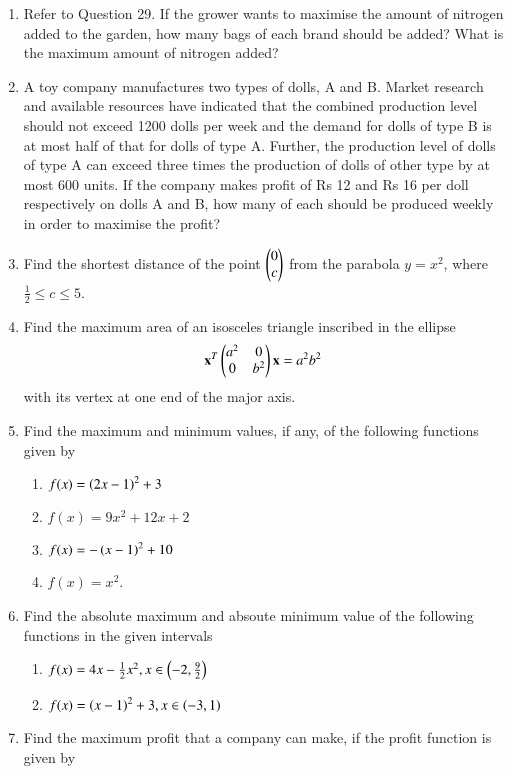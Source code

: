 \begin{enumerate}[label=\arabic*.,ref=\thesubsection.\theenumi]
\item Refer to Question 29. If the grower wants to maximise the amount of nitrogen
added to the garden, how many bags of each brand should be added? What is
the maximum amount of nitrogen added?\\
\item A toy company manufactures two types of dolls, A and B. Market research and
available resources have indicated that the combined production level should not
exceed 1200 dolls per week and the demand for dolls of type B is at most half of that
for dolls of type A. Further, the production level of dolls of type A can exceed three
times the production of dolls of other type by at most 600 units. If the company
makes profit of Rs 12 and Rs 16 per doll respectively on dolls A and B, how many of
each should be produced weekly in order to maximise the profit?
\item Find the shortest distance of the point $\begin{pmatrix}0\\c\end{pmatrix}$ from the parabola $y = x^2$, where $\frac{1}{2} \le c \le 5$.
\item Find the maximum area of an isosceles triangle inscribed in the ellipse 
%
\begin{align}
\mathbf{x}^T\begin{pmatrix}a^2 & 0 \\ 0 & b^2\end{pmatrix}\mathbf{x} = a^2b^2
\end{align}
%
with its vertex at one end of the major axis.
\item Find the maximum and minimum values, if any, of the following functions given by 
%
\begin{enumerate}
\item $f(x) = \left(2x-1\right)^2+3$
\item $f(x) = 9x^2+12x+2$
\item $f(x) = -\left(x-1\right)^2+10$
\item $f(x) = x^2$.
\end{enumerate}
\item Find the absolute maximum and absoute minimum value of the following functions in the given intervals
%
\begin{enumerate}
\item $f(x) = 4x - \frac{1}{2}x^2, x \in \left(-2,\frac{9}{2}\right)$
\item $f(x) = \left(x-1\right)^2 + 3,  x \in \left(-3,1\right)$
\end{enumerate}
%
\item Find the maximum profit that a company can make, if the profit function is given by
\begin{align}

\end{align}
\end{enumerate}
